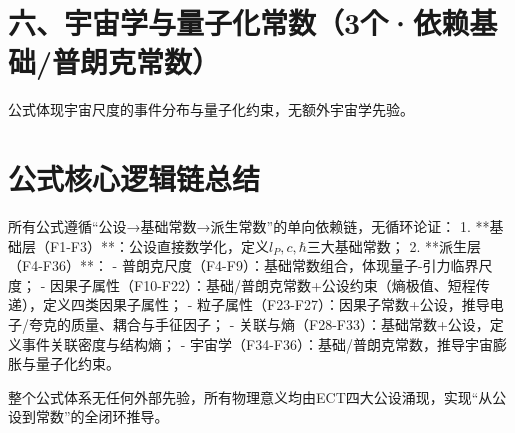 \documentclass{article}
\begin{document}
\section{六、宇宙学与量子化常数（3个·依赖基础/普朗克常数）}
公式体现宇宙尺度的事件分布与量子化约束，无额外宇宙学先验。
\begin{table}[h!]
\centering
{}
\end{table}


\section{公式核心逻辑链总结}
所有公式遵循“公设→基础常数→派生常数”的单向依赖链，无循环论证：
1. **基础层（F1-F3）**：公设直接数学化，定义\( l_P, c, \hbar \)三大基础常数；
2. **派生层（F4-F36）**：  
   - 普朗克尺度（F4-F9）：基础常数组合，体现量子-引力临界尺度；  
   - 因果子属性（F10-F22）：基础/普朗克常数+公设约束（熵极值、短程传递），定义四类因果子属性；  
   - 粒子属性（F23-F27）：因果子常数+公设，推导电子/夸克的质量、耦合与手征因子；  
   - 关联与熵（F28-F33）：基础常数+公设，定义事件关联密度与结构熵；  
   - 宇宙学（F34-F36）：基础/普朗克常数，推导宇宙膨胀与量子化约束。

整个公式体系无任何外部先验，所有物理意义均由ECT四大公设涌现，实现“从公设到常数”的全闭环推导。
\end{document}
